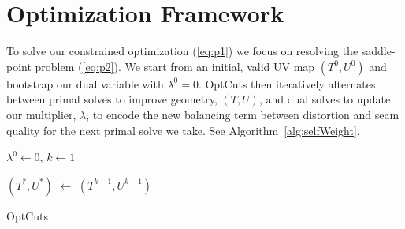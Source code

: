 
\section{Optimization Framework}

To solve our constrained optimization (\ref{eq:p1}) we focus on resolving the saddle-point problem (\ref{eq:p2}). 
We start from an initial, valid UV map $(T^0, U^0)$ and bootstrap our dual variable with $\lambda^0 = 0$. OptCuts then iteratively alternates between primal solves to improve geometry, $(T, U)$, and dual solves to update our multiplier, $\lambda$, to encode the new balancing term between distortion and seam quality for the next primal solve we take. See Algorithm~\ref{alg:selfWeight}.

\begin{algorithm}[!h]
\SetAlgoLined
{}

$\lambda^0 \leftarrow 0$, $k \leftarrow 1$\;

$(T^*, U^*)$ $\leftarrow$ $(T^{k-1}, U^{k-1})$\; 

\caption{OptCuts}
\label{alg:selfWeight}
\end{algorithm}

%
%


